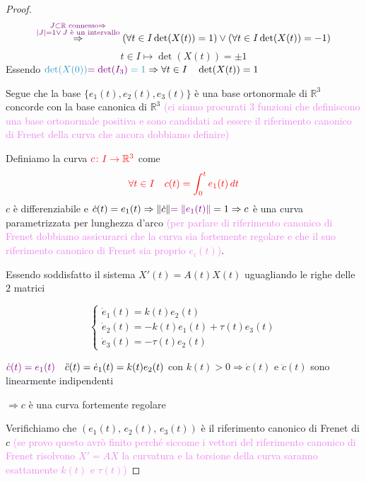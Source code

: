 \begin{proof}
        \[ \overset{\textcolor{violet}{\substack{J \subset \mathbb{R} \text{ connesso} \Rightarrow \\ \lvert J\rvert=1 \lor \, J \text{ è un intervallo}}}}{\Rightarrow} \left( \forall t \in I \det(X(t))=1 \right) \lor \left( \forall t \in I \det(X(t))=-1 \right) \]
        \[ t \in I \mapsto \det(X(t)) = \pm 1 \]
        Essendo $\textcolor{celeste}{\det(X(0)) \textcolor{violet}{= \det(I_3)} = 1} \Rightarrow \forall t \in I \quad \det(X(t)) = 1 $

        Segue che la base $\{ e_1(t), e_2(t), e_3(t) \}$ è una base ortonormale di $\mathbb{R}^3$ concorde con la base canonica di $\mathbb{R}^3$ 
        \textcolor{violet}{(ci siamo procurati $3$ funzioni che definiscono una base ortonormale positiva e sono candidati ad essere il riferimento
        canonico di Frenet della curva che ancora dobbiamo definire)}

        Definiamo la curva $\textcolor{red}{c \colon I \to \mathbb{R}^3}$ come 
        \[ \color{red} \forall t \in I \quad c(t)=\int_0^t  e_1(t) \, dt \]
        $c$ è differenziabile e $\dot{c}(t)=e_1(t) \Rightarrow \lVert\dot{c}\rVert\textcolor{violet}{=\lVert e_1(t)\rVert}=1 \Rightarrow c$ è una curva
        parametrizzata per lunghezza d'arco \textcolor{violet}{(per parlare di riferimento canonico di Frenet dobbiamo assicurarci che 
        la curva sia fortemente regolare e che il suo riferimento canonico di Frenet sia proprio $e_i(t)$)}.

        Essendo soddisfatto il sistema $X'(t) = A(t) X(t)$ uguagliando le righe delle $2$ matrici 

        \[ \begin{cases*}
        \dot{e}_1(t) = k(t) e_2(t) \\
        \dot{e}_2(t) = -k(t) e_1(t) + \tau(t) e_3(t) \\
        \dot{e}_3(t) = -\tau(t) e_2(t)
        \end{cases*} \]

        $\textcolor{violet}{\dot{c}(t)=e_1(t)} \quad \ddot{c}(t) = \dot{e}_1(t) = k(t) e_2(t)$ con $k(t)>0  \Rightarrow \dot{c}(t)$ e $\ddot{c}(t)$ sono linearmente indipendenti 
        
        $\Rightarrow c$ è una curva fortemente regolare

        Verifichiamo che $\left(e_1(t), \, e_2(t), \, e_3(t)\right)$ è il riferimento canonico di Frenet di $c$ \textcolor{violet}{(se 
        provo questo avrò finito perché siccome i vettori del riferimento canonico di Frenet risolvono $X'=AX$ la curvatura e la 
        torsione della curva saranno esattamente $k(t)$ e $\tau(t)$)}


\end{proof}
